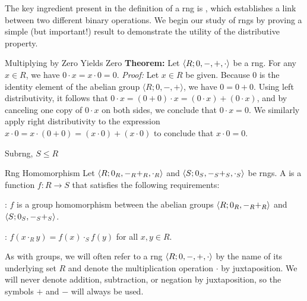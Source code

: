 \documentclass[12pt]{report}
\begin{document}
The key ingredient present in the definition of a rng is , which establishes a link between two different binary operations. We begin our study of rngs by proving a simple (but important!) result to demonstrate the utility of the distributive property.

\begin{thmbox}{Multiplying by Zero Yields Zero}
	\textbf{Theorem:} Let ${\langle {R; 0, -, +, \cdot} \rangle}$ be a rng. For any $x \in R$, we have $0 \cdot x = x \cdot 0 = 0$.
\tcblower
	\textit{Proof:} Let $x \in R$ be given. Because $0$ is the identity element of the abelian group $\langle R; 0, -, + \rangle$, we have $0 = 0 + 0$. Using left distributivity, it follows that $0 \cdot x = (0 + 0) \cdot x = (0 \cdot x) + (0 \cdot x)$, and by canceling one copy of $0 \cdot x$ on both sides, we conclude that $0 \cdot x = 0$. We similarly apply right distributivity to the expression $x \cdot 0 = x \cdot (0 + 0) = (x \cdot 0) + (x \cdot 0)$ to conclude that $x \cdot 0 = 0$.
\end{thmbox}

\begin{dfnbox}{Subrng, $S \le R$}
\end{dfnbox}

\begin{dfnbox}{Rng Homomorphism}
	Let ${\langle {R; 0_R, -_R +_R, \cdot_R} \rangle}$ and ${\langle {S; 0_S, -_S +_S, \cdot_S} \rangle}$ be rngs. A  is a function $f: R \to S$ that satisfies the following requirements:
	\begin{dfnitems}
		\item {}: $f$ is a group homomorphism between the abelian groups ${\langle {R; 0_R, -_R +_R} \rangle}$ and ${\langle {S; 0_S, -_S +_S} \rangle}$.
		\item {}: $f(x \cdot_R y) = f(x) \cdot_S f(y)$ for all $x, y \in R$.
	\end{dfnitems}
\end{dfnbox}

As with groups, we will often refer to a rng ${\langle {R; 0, -, +, \cdot} \rangle}$ by the name of its underlying set $R$ and denote the multiplication operation $\cdot$ by juxtaposition. We will never denote addition, subtraction, or negation by juxtaposition, so the symbols $+$ and $-$ will always be used.
\end{document}
